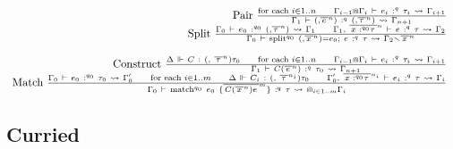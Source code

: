 \[\begin{array}{r}
 \\
{\text{Pair}\ \frac{{\text{for each }i \in 1..n}\text{\quad\quad}{\Gamma_{i - 1} \Cap \Gamma_{i}\  \vdash \ e_{i}\ :^{q}\ \tau_{i}\  \rightsquigarrow \ \Gamma_{i + 1}}}{\Gamma_{1}\  \vdash \ {(,{\overline{\, e\:}}^{n})}\ :^{q}\ {(,{\overline{\,\tau\:}}^{n})}\  \rightsquigarrow \ \Gamma_{n + 1}}\ } \\
{\text{Split}\ \frac{{\Gamma_{0}\  \vdash \ e_{0}\ :^{q_{0}}\ {(,{\overline{\,\tau\:}}^{n})}\  \rightsquigarrow \ \Gamma_{1}}\text{\quad\quad}{\Gamma_{1}{,\ }{\overline{\,{x\text{ :}^{q_{0}}\tau}\:}}^{n}\  \vdash \ e\ :^{q}\ \tau\  \rightsquigarrow \ \Gamma_{2}}}{\Gamma_{0}\  \vdash \ {\mathsf{\mathbf{\text{split}}}^{q_{0}}\ {(,{\overline{\, x\:}}^{n})} = e_{0};\ e}\ :^{q}\ \tau\  \rightsquigarrow \ \Gamma_{2} \smallsetminus {\overline{\, x\:}}^{n}}\ } \\
 \\
{\text{Construct}\ \frac{{\Delta\  \Vdash \ C\ :\ {({,\ }{\overline{\,\tau\:}}^{n})\tau_{0}}}\text{\quad\quad}{\text{for each }i \in 1..n}\text{\quad\quad}{\Gamma_{i - 1} \Cap \Gamma_{i}\  \vdash \ e_{i}\ :^{q}\ \tau_{i}\  \rightsquigarrow \ \Gamma_{i + 1}}}{\Gamma_{1}\  \vdash \ {C({\overline{\, e\:}}^{n})}\ :^{q}\ \tau_{0}\  \rightsquigarrow \ \Gamma_{n + 1}}\ } \\
{\text{Match}\ \frac{{\Gamma_{0}\  \vdash \ e_{0}\ :^{q_{0}}\ \tau_{0}\  \rightsquigarrow \ \Gamma'_{0}}\text{\quad\quad}{\text{for each }i \in 1..m}\text{\quad\quad}{\Delta\  \Vdash \ C_{i}\ :\ {({,\ }{\overline{\,\tau\:}}^{n_{i}})\tau_{0}}}\text{\quad\quad}{\Gamma'_{0}{,\ }{\overline{\,{x\text{ :}^{q_{0}}\tau}\:}}^{n_{i}}\  \vdash \ e_{i}\ :^{q}\ \tau\  \rightsquigarrow \ \Gamma_{i}}}{\Gamma_{0}\  \vdash \ {\mathsf{\mathbf{\text{match}}}^{q_{0}}\ e_{0}\ \{{\overline{\,{C({\overline{\, x\:}}^{n})}e\:}}^{m}\}}\ :^{q}\ \tau\  \rightsquigarrow \  \Cap_{i \in 1..m}\Gamma_{i}}\ }
\end{array}\]

\subsection{Curried}

